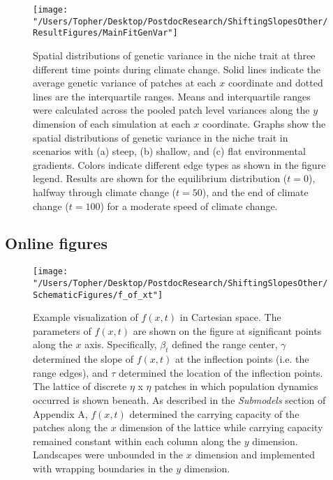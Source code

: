 \documentclass[11pt]{article}
\begin{document}
\begin{figure}[h!]
\texttt{[image: "/Users/Topher/Desktop/PostdocResearch/ShiftingSlopesOther/ResultFigures/MainFitGenVar"]}
\caption{Spatial distributions of genetic variance in the niche trait at three different time points during climate change. Solid lines indicate the average genetic variance of patches at each $x$ coordinate and dotted lines are the interquartile ranges. Means and interquartile ranges were calculated across the pooled patch level variances along the $y$ dimension of each simulation at each $x$ coordinate. Graphs show the spatial distributions of genetic variance in the niche trait in scenarios with (a) steep, (b) shallow, and (c) flat environmental gradients. Colors indicate different edge types as shown in the figure legend. Results are shown for the equilibrium distribution ($t = 0$), halfway through climate change ($t = 50$), and the end of climate change ($t = 100$) for a moderate speed of climate change.}
\label{fig:FitGenVar}
\end{figure}

\clearpage

\subsection*{Online figures}

\renewcommand{\thefigure}{A\arabic{figure}}
\setcounter{figure}{0}

\begin{figure}[h!]
\texttt{[image: "/Users/Topher/Desktop/PostdocResearch/ShiftingSlopesOther/SchematicFigures/f\_of\_xt"]}
\caption{Example visualization of $f(x,t)$ in Cartesian space. The parameters of $f(x,t)$ are shown on the figure at significant points along the $x$ axis. Specifically, $\beta_{t}$ defined the range center, $\gamma$ determined the slope of $f(x,t)$ at the inflection points (i.e. the range edges), and $\tau$ determined the location of the inflection points. The lattice of discrete $\eta$ x $\eta$ patches in which population dynamics occurred is shown beneath. As described in the \textit{Submodels} section of Appendix A, $f(x,t)$ determined the carrying capacity of the patches along the $x$ dimension of the lattice while carrying capacity remained constant within each column along the $y$ dimension. Landscapes were unbounded in the $x$ dimension and implemented with wrapping boundaries in the $y$ dimension.}
\label{Fig:EnvFunction}
\end{figure}
\end{document}
